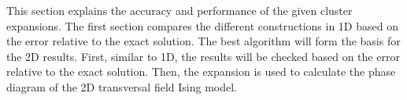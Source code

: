 This section explains the accuracy and performance of the given cluster expansions. The first section compares the different constructions in 1D based on the error relative to the exact solution. The best algorithm will form the basis for the 2D results. First, similar to 1D, the results will be checked based on the error relative to the exact solution. Then, the expansion is used to calculate the phase diagram of the 2D transversal field Ising model.